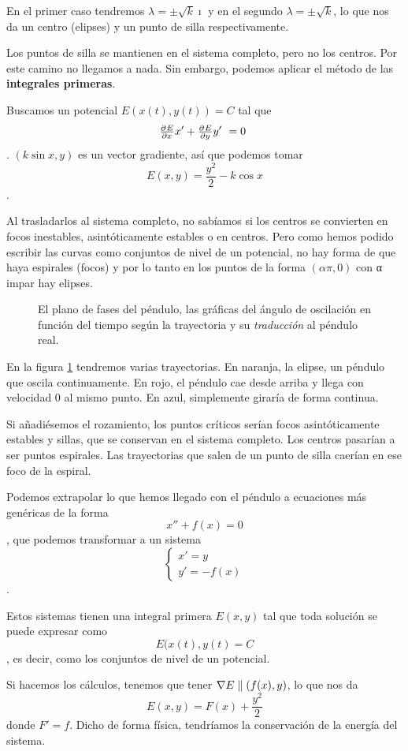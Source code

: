 En el primer caso tendremos $λ=\pm \sqrt{k} \imath$ y en el segundo $λ=\pm \sqrt{k}$, lo que nos da un centro (elipses) y un punto de silla respectivamente.

Los puntos de silla se mantienen en el sistema completo, pero no los centros. Por este camino no llegamos a nada. Sin embargo, podemos aplicar el método de las \textbf{integrales primeras}.

Buscamos un potencial $E(x(t), y(t)) = C$ tal que \[ \pd{E}{x}x' + \pd{E}{y}y' = 0 \]. $(k\sin x, y)$ es un vector gradiente, así que podemos tomar \[ E(x,y) = \frac{y^2}{2} - k\cos x \].

Al trasladarlos al sistema completo, no sabíamos si los centros se convierten en focos inestables, asintóticamente estables o en centros. Pero como hemos podido escribir las curvas como conjuntos de nivel de un potencial, no hay forma de que haya espirales (focos) y por lo tanto en los puntos de la forma $(απ, 0)$ con α impar hay elipses.

\begin{figure}[hbtp]
\label{imgPendulo}
\caption{El plano de fases del péndulo, las gráficas del ángulo de oscilación en función del tiempo según la trayectoria y su \textit{traducción} al péndulo real.}
\end{figure}

En la figura \ref{imgPendulo} tendremos varias trayectorias. En naranja, la elipse, un péndulo que oscila continuamente. En rojo, el péndulo cae desde arriba y llega con velocidad 0 al mismo punto. En azul, simplemente giraría de forma continua.

Si añadiésemos el rozamiento, los puntos críticos serían focos asintóticamente estables y sillas, que se conservan en el sistema completo. Los centros pasarían a ser puntos espirales. Las trayectorias que salen de un punto de silla caerían en ese foco de la espiral.

Podemos extrapolar lo que hemos llegado con el péndulo a ecuaciones más genéricas de la forma \[ x''+f(x) = 0 \], que podemos transformar a un sistema \[ \begin{cases} x' = y \\ y' = -f(x) \end{cases} \].

Estos sistemas tienen una integral primera $E(x,y)$ tal que toda solución se puede expresar como \[ E(x(t), y(t) = C \], es decir, como los conjuntos de nivel de un potencial.

Si hacemos los cálculos, tenemos que tener $\nabla E \parallel (f(x), y)$, lo que nos da \[ E(x,y) = F(x) + \frac{y^2}{2} \] donde $F' = f$. Dicho de forma física, tendríamos la conservación de la energía del sistema.

